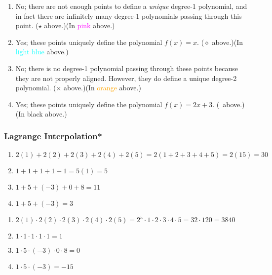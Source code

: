 \begin{answer}
    \renewcommand{\labelenumi}{(\alph{enumi})} 
    \begin{enumerate}
        \item No; there are not enough points to define a \emph{unique} degree-1 polynomial, and in fact there are infinitely many degree-1 polynomials passing through this point. \ifbw($\star$ above.)\else(In \textcolor{magenta}{pink} above.)\fi
        \item Yes; these points uniquely define the polynomial $f(x) = x$. \ifbw($\diamond$ above.)\else(In \textcolor{cyan}{light blue} above.)\fi
        \item No; there is no degree-1 polynomial passing through these points because they are not properly aligned. However, they do define a unique degree-2 polynomial. \ifbw($\times$ above.)\else(In \textcolor{orange}{orange} above.)\fi
        \item Yes; these points uniquely define the polynomial $f(x) = 2x + 3$. \ifbw(\textbullet\ above.)\else(In black above.)\fi
    \end{enumerate}
\end{answer}

\subsubsection{Lagrange Interpolation*}
\begin{answer}
    \renewcommand{\labelenumi}{(\alph{enumi})}
    \begin{enumerate}
        \item $2(1) + 2(2) + 2(3) + 2(4) + 2(5) = 2(1+2+3+4+5) = 2(15) = 30$
        \item $1+1+1+1+1 = 5(1) = 5$
        \item $1+5+(-3)+0+8 = 11$
        \item $1+5+(-3)=3$
    \end{enumerate}
\end{answer}

\begin{answer}
    \renewcommand{\labelenumi}{(\alph{enumi})}
    \begin{enumerate}
        \item $2(1) \cdot 2(2) \cdot 2(3) \cdot 2(4) \cdot 2(5) = 2^5\cdot1\cdot2\cdot3\cdot4\cdot5 
        = 32\cdot120 = 3840$
        \item $1\cdot1\cdot1\cdot1\cdot1 = 1$
        \item $1\cdot5\cdot(-3)\cdot0\cdot8 = 0$
        \item $1\cdot5\cdot(-3) = -15$
    \end{enumerate}
\end{answer}


